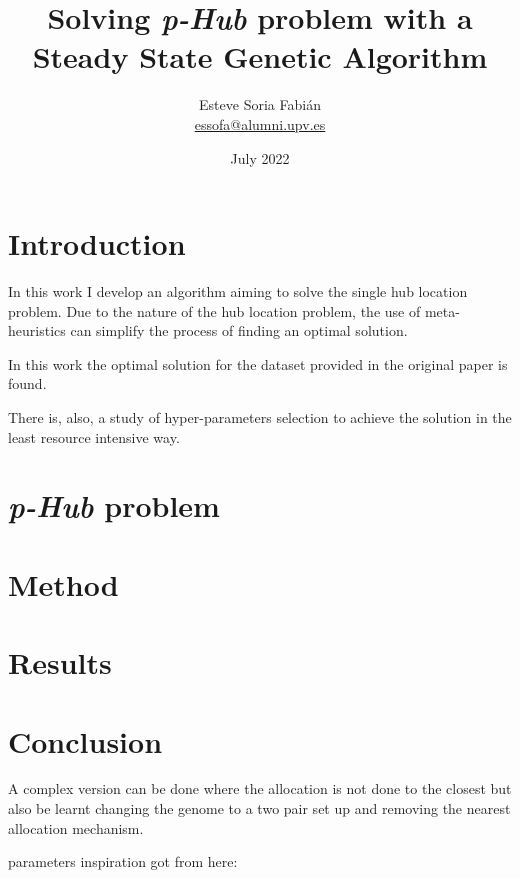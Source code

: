 \documentclass[12pt,oneside,a4paper]{article}
\title{Solving \textit{p-Hub} problem with a Steady State Genetic Algorithm}
\author{Esteve Soria Fabián \\ \href{mailto:essofa@alumni.upv.es}{essofa@alumni.upv.es}}
\date{July 2022}
\begin{document}
    \maketitle
    \newpage


    \section{Introduction}
    In this work I develop an algorithm aiming to solve the single hub location problem.
    Due to the nature of the hub location problem, the use of meta-heuristics can simplify the process of finding an
    optimal solution.

    In this work the optimal solution for the dataset provided in the original paper\cite{OKELLY1987393} is found.

    There is, also, a study of hyper-parameters selection to achieve the solution in the least resource intensive way.


    \section{\textit{p-Hub} problem}


    \section{Method}


    \section{Results}


    \section{Conclusion}

    A complex version can be done where the allocation is not done to the closest but also be learnt changing the
    genome to a two pair set up and removing the nearest allocation mechanism. \cite{Capacitated_allo_Zorica}


    parameters inspiration got from here: \cite{Zhou2016/09}


    \newpage
    
    
\end{document}
